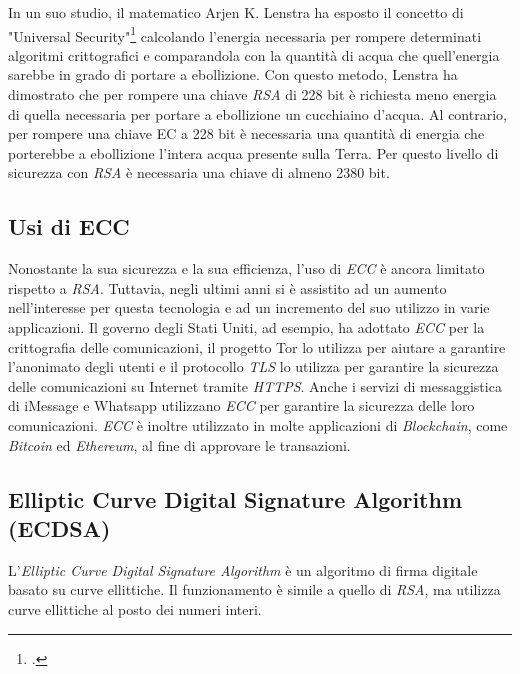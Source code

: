 In un suo studio, il matematico Arjen K. Lenstra ha esposto il concetto di "Universal Security"\footcite{site:universal-security} calcolando l'energia necessaria per rompere determinati algoritmi crittografici e comparandola con la quantità di acqua che quell'energia sarebbe in grado di portare a ebollizione.
Con questo metodo, Lenstra ha dimostrato che per rompere una chiave \emph{RSA} di 228 bit è richiesta meno energia di quella necessaria per portare a ebollizione un cucchiaino d'acqua.
Al contrario, per rompere una chiave EC a 228 bit è necessaria una quantità di energia che porterebbe a ebollizione l'intera acqua presente sulla Terra.
Per questo livello di sicurezza con \emph{RSA} è necessaria una chiave di almeno 2380 bit.

\subsection{Usi di ECC}
Nonostante la sua sicurezza e la sua efficienza, l'uso di \emph{ECC} è ancora limitato rispetto a \emph{RSA}.
Tuttavia, negli ultimi anni si è assistito ad un aumento nell'interesse per questa tecnologia e ad un incremento del suo utilizzo in varie applicazioni.
Il governo degli Stati Uniti, ad esempio, ha adottato \emph{ECC} per la crittografia delle comunicazioni, il progetto Tor lo utilizza per aiutare a garantire l'anonimato degli utenti e il protocollo \emph{\gls{TLS}} lo utilizza per garantire la sicurezza delle comunicazioni su Internet tramite \emph{\gls{HTTPS}}.
Anche i servizi di messaggistica di iMessage e Whatsapp utilizzano \emph{ECC} per garantire la sicurezza delle loro comunicazioni.
\emph{ECC} è inoltre utilizzato in molte applicazioni di \emph{\gls{Blockchain}}, come \emph{Bitcoin} ed \emph{Ethereum}, al fine di approvare le transazioni.

\subsection{Elliptic Curve Digital Signature Algorithm (ECDSA)}
\label{sec:ecdsa}

L'\emph{Elliptic Curve Digital Signature Algorithm} è un algoritmo di firma digitale basato su curve ellittiche.
Il funzionamento è simile a quello di \emph{RSA}, ma utilizza curve ellittiche al posto dei numeri interi.

